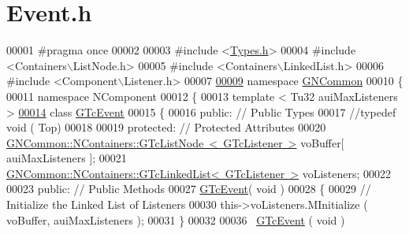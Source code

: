 \hypertarget{_event_8h_source}{}\section{Event.\+h}
\label{_event_8h_source}

\begin{DoxyCode}
00001 \textcolor{preprocessor}{#pragma once}
00002 
00003 \textcolor{preprocessor}{#include <\mbox{\hyperlink{_types_8h}{Types.h}}>}
00004 \textcolor{preprocessor}{#include <Containers\(\backslash\)ListNode.h>}
00005 \textcolor{preprocessor}{#include <Containers\(\backslash\)LinkedList.h>}
00006 \textcolor{preprocessor}{#include <Component\(\backslash\)Listener.h>}
00007 
\mbox{\hyperlink{namespace_g_n_common}{00009}} \textcolor{keyword}{namespace }\mbox{\hyperlink{namespace_g_n_common}{GNCommon}}
00010 \{
00011    \textcolor{keyword}{namespace }NComponent
00012    \{
00013       \textcolor{keyword}{template} < Tu32 auiMaxListeners >
\mbox{\hyperlink{class_g_n_common_1_1_n_component_1_1_g_tc_event}{00014}}       \textcolor{keyword}{class }\mbox{\hyperlink{class_g_n_common_1_1_n_component_1_1_g_tc_event}{GTcEvent}}
00015       \{
00016       \textcolor{keyword}{public}:        \textcolor{comment}{// Public Types}
00017          \textcolor{comment}{//typedef void ( Top)}
00018 
00019       \textcolor{keyword}{protected}:     \textcolor{comment}{// Protected Attributes}
00020          \mbox{\hyperlink{class_g_n_common_1_1_n_containers_1_1_g_tc_list_node}{GNCommon::NContainers::GTcListNode  < GTcListener >}}
       voBuffer[ auiMaxListeners ];
00021          \mbox{\hyperlink{class_g_n_common_1_1_n_containers_1_1_g_tc_linked_list}{GNCommon::NContainers::GTcLinkedList< GTcListener >}}
       voListeners;
00022 
00023       \textcolor{keyword}{public}:        \textcolor{comment}{// Public Methods}
00027 \textcolor{comment}{}         \mbox{\hyperlink{class_g_n_common_1_1_n_component_1_1_g_tc_event}{GTcEvent}}( \textcolor{keywordtype}{void} )
00028          \{
00029             \textcolor{comment}{// Initialize the Linked List of Listeners}
00030             this->voListeners.MInitialize ( voBuffer, auiMaxListeners );
00031          \}
00032 
00036          ~\mbox{\hyperlink{class_g_n_common_1_1_n_component_1_1_g_tc_event}{GTcEvent}} ( \textcolor{keywordtype}{void} )

\end{DoxyCode}
